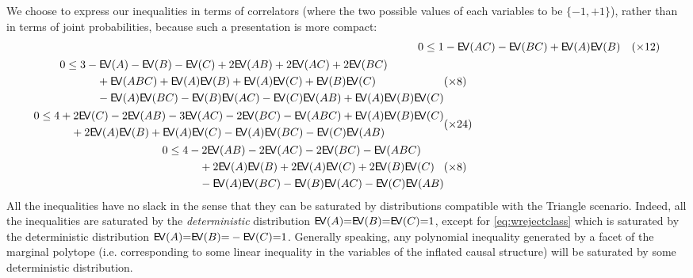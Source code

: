 \documentclass[aps,english,10pt,superscriptaddress,onecolumn,twoside,longbibliography,pra,floatfix,fleqn,nofootinbib]{revtex4-1}
\theoremstyle{definition}
\newcommand{\eql}{\mathord{=}}
\DeclarePairedDelimiter{\expec}{\mathsf{E\!V}\lparen}{\rparen}
\begin{document}
We choose to express our inequalities in terms of correlators (where the two possible values of each variables to be $\{-1,+1\}$), rather than in terms of joint probabilities, because such a presentation is more compact:
\begin{align}\label{eq:ghzrejectclass}
0\leq 1& - \expec{A C} - \expec{B C} + \expec{A} \expec{B} &(\times 12)
\\\label{eq:wrejectclass}
\begin{split}0\leq 3& - \expec{A} - \expec{B} - \expec{C} +2 \expec{A B} +2 \expec{A C} +2 \expec{B C}  \\&\quad+ \expec{A B C}+ \expec{A} \expec{B} + \expec{A} \expec{C} + \expec{B} \expec{C} \\&\quad- \expec{A} \expec{B C} - \expec{B}
   \expec{A C} - \expec{C} \expec{A B} + \expec{A} \expec{B} \expec{C}  \end{split}&(\times 8)
   \\\label{eq:symclass3}\begin{split}
0\leq 4& +2 \expec{C} -2 \expec{A B} -3 \expec{A C} -2 \expec{B C} - \expec{A B C} + \expec{A} \expec{B} \expec{C} 
\\&\quad +2 \expec{A} \expec{B} + \expec{A} \expec{C} - \expec{A} \expec{B C} - \expec{C} \expec{A B} \end{split}&(\times 24)
   \\\label{eq:symclass4}\begin{split}
0\leq 4& -2 \expec{A B} -2 \expec{A C} -2 \expec{B C} - \expec{A B C} 
  \\&\quad +2 \expec{A} \expec{B} +2 \expec{A} \expec{C} +2 \expec{B} \expec{C} 
  \\&\quad - \expec{A} \expec{B C} - \expec{B} \expec{A C} - \expec{C} \expec{A B} \end{split}&(\times 8)
\end{align}
All the inequalities  have no slack in the sense that they can be saturated by distributions compatible with the Triangle scenario. Indeed, all the inequalities are saturated by the \emph{deterministic} distribution $\expec{A}\eql\expec{B}\eql\expec{C}\eql 1$, except for \cref{eq:wrejectclass} which is saturated by the deterministic distribution $\expec{A}\eql\expec{B}\eql-\expec{C}\eql 1$. Generally speaking, any polynomial inequality generated by a facet of the marginal polytope (i.e. corresponding to some linear inequality in the variables of the inflated causal structure) will be saturated by some deterministic distribution.
\end{document}
